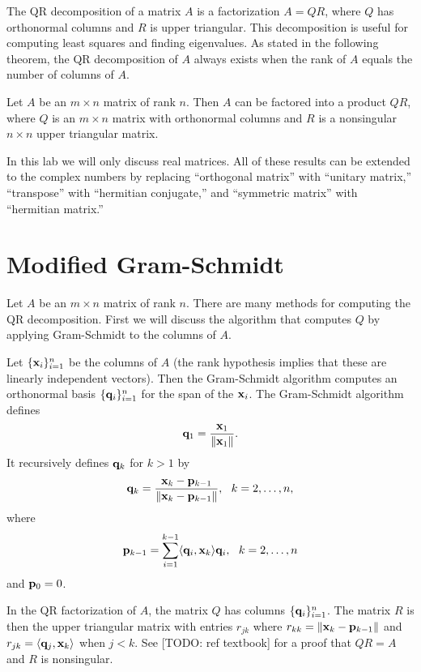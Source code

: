 \label{lab:QRdecomp}

The QR decomposition of a matrix $A$ is a factorization $A=QR$, where $Q$ has orthonormal columns and $R$ is upper triangular.
This decomposition is useful for computing least squares and finding eigenvalues.
As stated in the following theorem, the QR decomposition of $A$ always exists when the rank of $A$ equals the number of columns of $A$.
\begin{theorem}
Let $A$ be an $m\times n$ matrix of rank $n$.  Then $A$ can be
factored into a product $Q R$, where $Q$ is an $m\times n$ matrix
with orthonormal columns and $R$ is a nonsingular $n \times n$ upper
triangular matrix.
\end{theorem}

In this lab we will only discuss real matrices. 
All of these results can be extended to the complex numbers by replacing ``orthogonal matrix'' with ``unitary matrix,'' ``transpose'' with ``hermitian conjugate,'' and ``symmetric matrix'' with ``hermitian matrix.''

\section*{Modified Gram-Schmidt}
Let $A$ be an $m \times n$ matrix of rank $n$.
There are many methods for computing the QR decomposition.
First we will discuss the algorithm that computes $Q$ by applying Gram-Schmidt to the columns of $A$.

Let $\{{\bf x}_i\}_{i=1}^n$ be the columns of $A$ (the rank hypothesis implies that these are linearly independent vectors).
Then the Gram-Schmidt algorithm computes an orthonormal basis $\{{\bf q}_i\}_{i=1}^n$ for the span of the ${\bf x}_i$. 
The Gram-Schmidt algorithm defines  \[ {\bf q}_1 = \frac{{\bf x}_1}{\left\lVert{\bf x}_1\right\rVert}.\]
It recursively defines ${\bf q}_k$ for $k>1$ by
\[
{\bf q}_{k} = \frac{{\bf x}_k - {\bf p}_{k-1}}{\|{\bf x}_k - {\bf p}_{k-1}\|}, \,\,\,\, k=2,\ldots,n,
\]
where
\[
{\bf p}_{k-1} = \sum_{i=1}^{k-1} \langle {\bf q}_i, {\bf x}_k\rangle {\bf q}_i, \,\,\,\, k=2, \ldots, n
\]
and ${\bf p}_0 = 0$. 

In the QR factorization of $A$, the matrix $Q$ has columns $\{{\bf q}_i\}_{i=1}^n$. 
The matrix $R$ is then the upper triangular matrix with entries $r_{jk}$ where $r_{kk} = \|{\bf x}_k-{\bf p}_{k-1}\|$ and $r_{j k} = \langle {\bf q}_j, {\bf x}_k\rangle$ when $j < k$. 
See [TODO: ref textbook] for a proof that $QR=A$ and $R$ is nonsingular.


